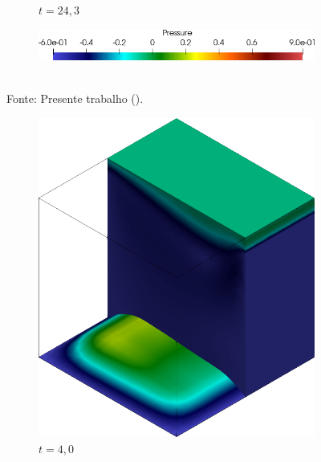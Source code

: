 \begin{figure}[h!]
\begin{subfigure}[b]{0.35\textwidth}
        \caption{$t=24,3$}
    \end{subfigure}
    \begin{subfigure}[b]{0.5\textwidth}
        \includegraphics[width=\linewidth]{Figuras/FSI-Cavity3D/lp.png}
    \end{subfigure}
    \\Fonte: Presente trabalho (\the\year).
    \label{fig:Cavity3D-press}
\end{figure}

\begin{figure}[h!]
    \centering
    \caption{Cavidade tridimensional - Campo de velocidades na cavidade.}
    \begin{subfigure}[b]{0.35\textwidth}
        \includegraphics[width=\linewidth]{Figuras/FSI-Cavity3D/u4.png}
        \caption{$t=4,0$}
    \end{subfigure}
    \begin{subfigure}[b]{0.35\textwidth}

\end{subfigure}
\end{figure}
